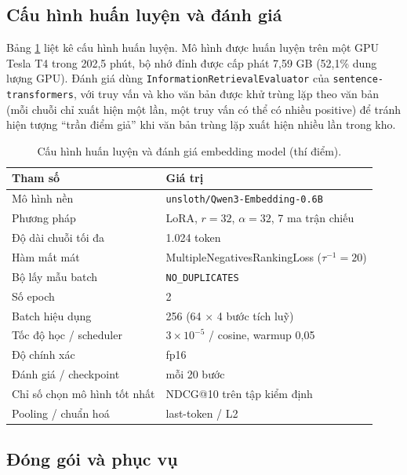 \subsection{Cấu hình huấn luyện và đánh giá}
\label{sec:ft-config}

Bảng \ref{tab:ft-emb-config} liệt kê cấu hình huấn luyện. Mô hình được huấn luyện trên một
GPU Tesla T4 trong 202,5 phút, bộ nhớ đỉnh được cấp phát 7,59 GB (52,1\% dung lượng GPU).
Đánh giá dùng \texttt{InformationRetrievalEvaluator} của \texttt{sentence-transformers}, với
truy vấn và kho văn bản được khử trùng lặp theo văn bản (mỗi chuỗi chỉ xuất hiện một lần, một
truy vấn có thể có nhiều positive) để tránh hiện tượng ``trần điểm giả'' khi văn bản trùng lặp
xuất hiện nhiều lần trong kho.

\begin{table}[htbp]
\centering
\caption{Cấu hình huấn luyện và đánh giá embedding model (thí điểm).}
\label{tab:ft-emb-config}
\small
\begin{tabular}{@{}p{6.4cm}p{8cm}@{}}
\toprule
\textbf{Tham số} & \textbf{Giá trị} \\
\midrule
Mô hình nền & \texttt{unsloth/Qwen3-Embedding-0.6B} \\
Phương pháp & LoRA, $r=32$, $\alpha=32$, 7 ma trận chiếu \\
Độ dài chuỗi tối đa & 1.024 token \\
Hàm mất mát & MultipleNegativesRankingLoss ($\tau^{-1}=20$) \\
Bộ lấy mẫu batch & \texttt{NO\_DUPLICATES} \\
Số epoch & 2 \\
Batch hiệu dụng & 256 (64 $\times$ 4 bước tích luỹ) \\
Tốc độ học / scheduler & $3\times10^{-5}$ / cosine, warmup 0{,}05 \\
Độ chính xác & fp16 \\
Đánh giá / checkpoint & mỗi 20 bước \\
Chỉ số chọn mô hình tốt nhất & NDCG@10 trên tập kiểm định \\
Pooling / chuẩn hoá & last-token / L2 \\
\bottomrule
\end{tabular}
\end{table}

\subsection{Đóng gói và phục vụ}
\label{sec:ft-deploy}

